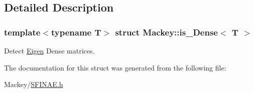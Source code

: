 \subsection{Detailed Description}
\subsubsection*{template$<$typename T$>$\newline
struct Mackey\+::is\+\_\+\+Dense$<$ T $>$}

Detect \hyperlink{namespaceEigen}{Eigen} Dense matrices. 

The documentation for this struct was generated from the following file\+:\begin{DoxyCompactItemize}
\item 
Mackey/\hyperlink{SFINAE_8h}{S\+F\+I\+N\+A\+E.\+h}\end{DoxyCompactItemize}
